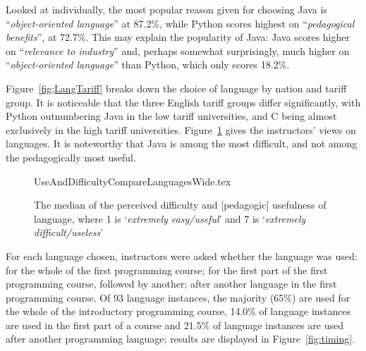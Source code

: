 \documentclass[english]{programming}
\begin{document}
Looked at individually, the most popular reason given for choosing
Java is ``{\emph{object-oriented language}}'' at 87.2\%, while Python
scores highest on ``{\emph{pedagogical benefits}}'', at 72.7\%. This
may explain the popularity of Java: Java scores higher on
``{\emph{relevance to industry}}'' and, perhaps somewhat surprisingly,
much higher on ``{\emph{object-oriented language}}'' than Python,
which only scores 18.2\%.


Figure~\ref{fig;LangTariff} breaks down the choice of language by
nation and tariff group.  It is noticeable that the three English
tariff groups differ significantly, with Python outnumbering Java in
the low tariff universities, and C being almost exclusively in the
high tariff universities. Figure~\ref{fig:utility} gives the
instructors' views on languages. It is noteworthy that Java is among
the most difficult, and not among the pedagogically most useful.

\begin{figure}
\begin{center}
{UseAndDifficultyCompareLanguagesWide.tex}
\end{center}
\caption{The median of the perceived difficulty and [pedagogic] usefulness of language, where 1 is `{\emph{extremely easy/useful}}' and 7 is `{\emph{extremely difficult/useless}}'%
\label{fig:utility}}
\end{figure}

For each language chosen, instructors were asked whether the language
was used: for the whole of the first programming course; for the first
part of the first programming course, followed by another; after
another language in the first programming course. Of 93 language
instances, the majority (65\%) are used for the whole of the
introductory programming course, 14.0\% of language instances are used
in the first part of a course and 21.5\% of language instances are
used after another programming language; results are displayed in
Figure~\ref{fig:timing}.
\end{document}
